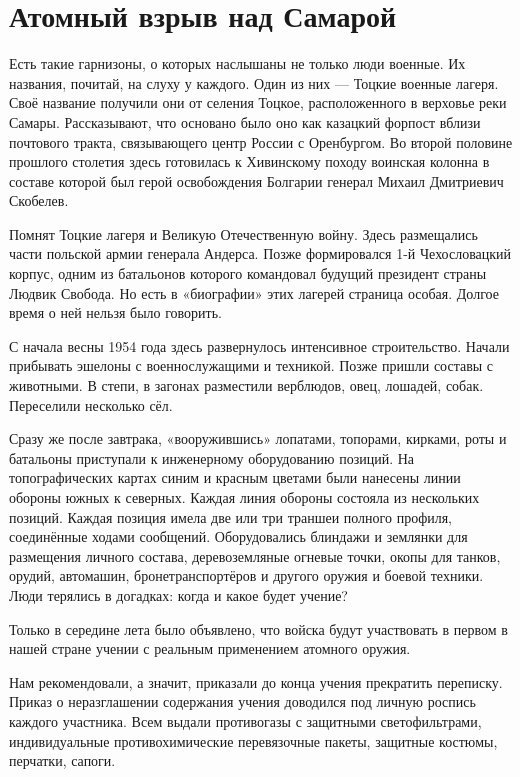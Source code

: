 \section*{Атомный взрыв над Самарой}

Есть такие гарнизоны, о которых наслышаны не только люди военные.
Их названия, почитай, на слуху у каждого.
Один из них — Тоцкие военные лагеря.
Своё название получили они от селения Тоцкое, расположенного в верховье реки Самары.
Рассказывают, что основано было оно как казацкий форпост вблизи почтового тракта, связывающего центр России с Оренбургом.
Во второй половине прошлого столетия здесь готовилась к Хивинскому походу воинская колонна в составе которой был герой освобождения Болгарии генерал Михаил Дмитриевич Скобелев.

Помнят Тоцкие лагеря и Великую Отечественную войну.
Здесь размещались части польской армии генерала Андерса.
Позже формировался 1-й Чехословацкий корпус, одним из батальонов которого командовал будущий президент страны Людвик Свобода.
Но есть в «биографии» этих лагерей страница особая.
Долгое время о ней нельзя было говорить.

С начала весны 1954 года здесь развернулось интенсивное строительство.
Начали прибывать эшелоны с военнослужащими и техникой.
Позже пришли составы с животными.
В степи, в загонах разместили верблюдов, овец, лошадей, собак.
Переселили несколько сёл.

Сразу же после завтрака, «вооружившись» лопатами, топорами, кирками, роты и батальоны приступали к инженерному оборудованию позиций.
На топографических картах синим и красным цветами были нанесены линии обороны южных к северных.
Каждая линия обороны состояла из нескольких позиций.
Каждая позиция имела две или три траншеи полного профиля, соединённые ходами сообщений.
Оборудовались блиндажи и землянки для размещения личного состава, деревоземляные огневые точки, окопы для танков, орудий, автомашин, бронетранспортёров и другого оружия и боевой техники.
Люди терялись в догадках: когда и какое будет учение?

Только в середине лета было объявлено, что войска будут участвовать в первом в нашей стране учении с реальным применением атомного оружия.

Нам рекомендовали, а значит, приказали до конца учения прекратить переписку.
Приказ о неразглашении содержания учения доводился под личную роспись каждого участника.
Всем выдали противогазы с защитными светофильтрами, индивидуальные противохимические перевязочные пакеты, защитные костюмы, перчатки, сапоги.

